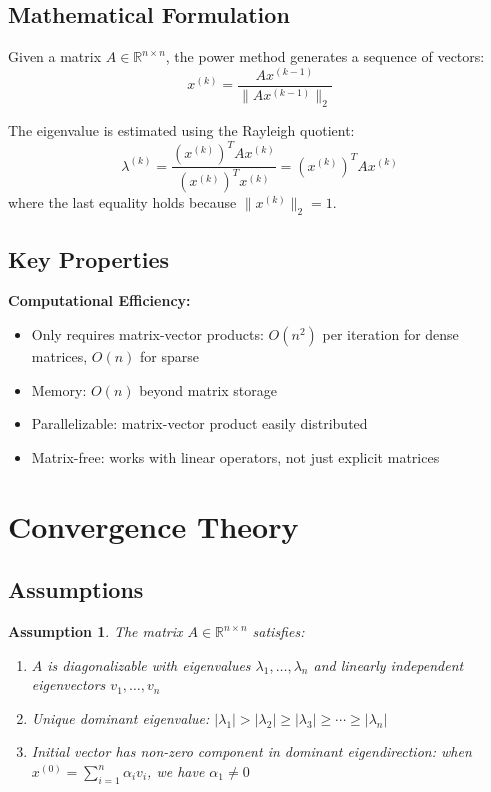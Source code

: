 \documentclass[11pt,twocolumn]{article}
\newtheorem{assumption}{Assumption}
\begin{document}
\subsection{Mathematical Formulation}

Given a matrix $A \in \mathbb{R}^{n \times n}$, the power method generates a sequence of vectors:
\begin{equation}
x^{(k)} = \frac{A x^{(k-1)}}{\|A x^{(k-1)}\|_2}
\end{equation}

The eigenvalue is estimated using the Rayleigh quotient:
\begin{equation}
\lambda^{(k)} = \frac{(x^{(k)})^T A x^{(k)}}{(x^{(k)})^T x^{(k)}} = (x^{(k)})^T A x^{(k)}
\end{equation}
where the last equality holds because $\|x^{(k)}\|_2 = 1$.

\subsection{Key Properties}

\textbf{Computational Efficiency:}
\begin{itemize}
\item Only requires matrix-vector products: $O(n^2)$ per iteration for dense matrices, $O(n)$ for sparse
\item Memory: $O(n)$ beyond matrix storage
\item Parallelizable: matrix-vector product easily distributed
\item Matrix-free: works with linear operators, not just explicit matrices
\end{itemize}

\section{Convergence Theory}

\subsection{Assumptions}

\begin{assumption}
\label{ass:main}
The matrix $A \in \mathbb{R}^{n \times n}$ satisfies:
\begin{enumerate}
    \item $A$ is diagonalizable with eigenvalues $\lambda_1, \ldots, \lambda_n$ and linearly independent eigenvectors $v_1, \ldots, v_n$
    \item Unique dominant eigenvalue: $|\lambda_1| > |\lambda_2| \geq |\lambda_3| \geq \cdots \geq |\lambda_n|$
    \item Initial vector has non-zero component in dominant eigendirection: when $x^{(0)} = \sum_{i=1}^n \alpha_i v_i$, we have $\alpha_1 \neq 0$
\end{enumerate}
\end{assumption}
\end{document}
